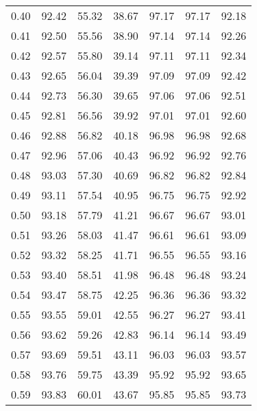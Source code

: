 \begin{tabular}{|c|c|c|c|c|c|c|}
      0.40 &     92.42 &     55.32 &      38.67 &   97.17 &      97.17 &         92.18 \\
      0.41 &     92.50 &     55.56 &      38.90 &   97.14 &      97.14 &         92.26 \\
      0.42 &     92.57 &     55.80 &      39.14 &   97.11 &      97.11 &         92.34 \\
      0.43 &     92.65 &     56.04 &      39.39 &   97.09 &      97.09 &         92.42 \\
      0.44 &     92.73 &     56.30 &      39.65 &   97.06 &      97.06 &         92.51 \\
      0.45 &     92.81 &     56.56 &      39.92 &   97.01 &      97.01 &         92.60 \\
      0.46 &     92.88 &     56.82 &      40.18 &   96.98 &      96.98 &         92.68 \\
      0.47 &     92.96 &     57.06 &      40.43 &   96.92 &      96.92 &         92.76 \\
      0.48 &     93.03 &     57.30 &      40.69 &   96.82 &      96.82 &         92.84 \\
      0.49 &     93.11 &     57.54 &      40.95 &   96.75 &      96.75 &         92.92 \\
      0.50 &     93.18 &     57.79 &      41.21 &   96.67 &      96.67 &         93.01 \\
      0.51 &     93.26 &     58.03 &      41.47 &   96.61 &      96.61 &         93.09 \\
      0.52 &     93.32 &     58.25 &      41.71 &   96.55 &      96.55 &         93.16 \\
      0.53 &     93.40 &     58.51 &      41.98 &   96.48 &      96.48 &         93.24 \\
      0.54 &     93.47 &     58.75 &      42.25 &   96.36 &      96.36 &         93.32 \\
      0.55 &     93.55 &     59.01 &      42.55 &   96.27 &      96.27 &         93.41 \\
      0.56 &     93.62 &     59.26 &      42.83 &   96.14 &      96.14 &         93.49 \\
      0.57 &     93.69 &     59.51 &      43.11 &   96.03 &      96.03 &         93.57 \\
      0.58 &     93.76 &     59.75 &      43.39 &   95.92 &      95.92 &         93.65 \\
      0.59 &     93.83 &     60.01 &      43.67 &   95.85 &      95.85 &         93.73 \\

\end{tabular}
